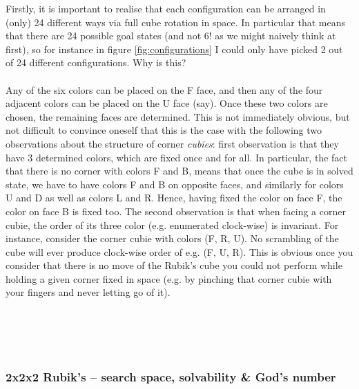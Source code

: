 Firstly, it is important to realise that each configuration can be arranged in (only) 24 different ways via full cube rotation in space. In particular that means that there are 24 possible goal states (and not 6! as we might naively think at first), so for instance in figure \ref{fig:configurations} I could only have picked 2 out of 24 different configurations. Why is this?
\\
\\
Any of the six colors can be placed on the F face, and then any of the four adjacent colors can be placed on the U face (say). Once these two colors are chosen, the remaining faces are determined. This is not immediately obvious, but not difficult to convince oneself that this is the case with the following two observations about the structure of corner \textit{cubies}: first observation is that they have 3 determined colors, which are fixed once and for all. In particular, the fact that there is no corner with colors F and B, means that once the cube is in solved state, we have to have colors F and B on opposite faces, and similarly for colors U and D as well as colors L and R. Hence, having fixed the color on face F, the color on face B is fixed too. The second observation is that when facing a corner cubie, the order of its three color (e.g. enumerated clock-wise) is invariant. For instance, consider the corner cubie with colors (F, R, U). No scrambling of the cube will ever produce clock-wise order of e.g. (F, U, R). This is obvious once you consider that there is no move of the Rubik's cube you could not perform while holding a given corner fixed in space (e.g. by pinching that corner cubie with your fingers and never letting go of it).
\\
\\

\cite{RubiksGodNumber}
\\
\cite{RubiksChicago}
\\
\cite{RubiksRadu}
\\

\subsubsection{2x2x2 Rubik's -- search space, solvability \& God's number}

